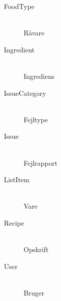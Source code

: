 

\begin{description}

  \item[FoodType] \hfill \\
  Råvare

  \item[Ingredient] \hfill \\
  Ingrediens

  \item[IssueCategory] \hfill \\
  Fejltype

  \item[Issue] \hfill \\
  Fejlrapport

  \item[ListItem] \hfill \\
  Vare

  \item[Recipe] \hfill \\
  Opskrift

  \item[User] \hfill \\
  Bruger

\end{description}

